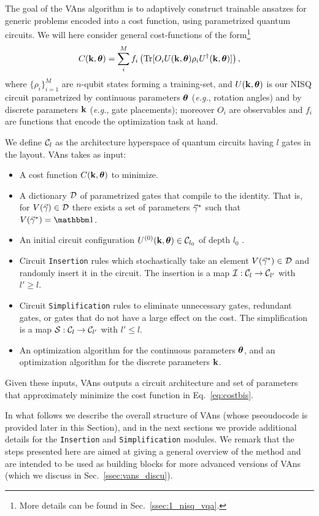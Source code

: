 The goal of the VAns algorithm is to adaptively construct trainable ansatzes for generic problems encoded into a cost function, using parametrized quantum circuits. We will here consider general cost-functions of the form\footnote{More details can be found in Sec.~\ref{ssec:1_nisq_vqa}.}
\begin{equation}\label{eq:costbis}
    C(\mathbf{k},\bm{\theta})=\sum_i^M f_i\left(\text{Tr}[O_i U(\mathbf{k},\bm{\theta})\rho_i U^\dagger (\mathbf{k},\bm{\theta})]\right),
\end{equation}
where $\{\rho_i\}_{i=1}^M$ are $n$-qubit states forming a training-set, and $U(\mathbf{k},\bm{\theta})$ is our NISQ circuit parametrized by continuous parameters $\bm{\theta}$ (\textit{e.g.}, rotation angles) and by discrete parameters $\mathbf{k}$ (\textit{e.g.}, gate placements); moreover $O_i$ are observables and $f_i$ are functions that encode the optimization task at hand.

We define $\mathcal{C}_l$ as the architecture hyperspace of quantum circuits having $l$ gates in the layout. VAns takes as input:
\begin{itemize}
    \item A cost function $C(\mathbf{k},\bm{\theta})$ to minimize.
    \item A dictionary $\mathcal{D}$ of parametrized gates that compile to the identity. That is, for  $V(\vec{\gamma})\in\mathcal{D}$ there exists a set of parameters $\vec{\gamma}^*$ such that $V(\gamv^*)=\id$.
    \item An initial circuit configuration $U^{(0)}(\mathbf{k},\bm{\theta})\in\mathcal{C}_{l_0}$ of depth $l_0$ .
    \item Circuit \texttt{Insertion} rules which stochastically take an element $V(\vec{\gamma}^*)\in\mathcal{D}$ and randomly insert it in the circuit. The insertion is a map $\mathcal{I}:\mathcal{C}_l\rightarrow \mathcal{C}_{l'}$ with $l'\geq l$.
    \item Circuit \texttt{Simplification} rules to eliminate unnecessary gates, redundant gates, or gates that do not have a large effect on the cost. The simplification is a map $\mathcal{S}:\mathcal{C}_l\rightarrow \mathcal{C}_{l'}$ with $l'\leq l$.
    \item An optimization algorithm for the continuous parameters $\bm{\theta}$, and an optimization algorithm for the discrete parameters $\mathbf{k}$.
\end{itemize}
Given these inputs, VAns outputs a circuit architecture and set of parameters that approximately minimize the cost function in Eq.~\ref{eq:costbis}.

In what follows we describe the overall structure of VAns (whose pseoudocode is provided later in this Section), and in the next sections we provide additional details for the \texttt{Insertion} and \texttt{Simplification} modules. We remark that the steps presented here are aimed at giving a general overview of the method and are intended to be used as building blocks for more advanced versions of VAns (which we discuss in Sec.~\ref{ssec:vans_discu}).

